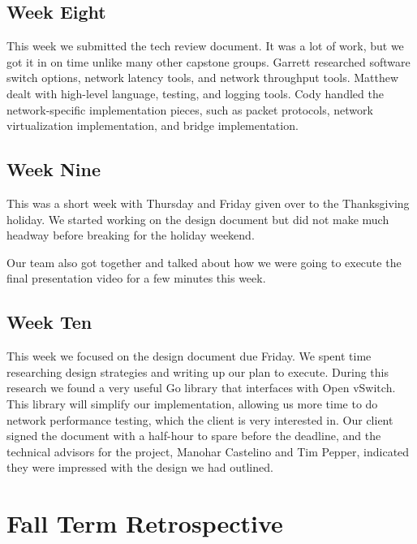 \documentclass[10pt,onecolumn,journal,draftclsnofoot]{IEEEtran}
\begin{document}
\subsection{Week Eight}

This week we submitted the tech review document. It was a lot of work, but we
got it in on time unlike many other capstone groups. Garrett researched software
switch options, network latency tools, and network throughput tools. Matthew
dealt with high-level language, testing, and logging tools. Cody handled the
network-specific implementation pieces, such as packet protocols, network
virtualization implementation, and bridge implementation.

\subsection{Week Nine}

This was a short week with Thursday and Friday given over to the Thanksgiving
holiday. We started working on the design document but did not make much headway
before breaking for the holiday weekend.

Our team also got together and talked about how we were going to execute the
final presentation video for a few minutes this week.

\subsection{Week Ten}

This week we focused on the design document due Friday. We spent time
researching design strategies and writing up our plan to execute. During this
research we found a very useful Go library that interfaces with Open vSwitch.
This library will simplify our implementation, allowing us more time to do
network performance testing, which the client is very interested in. Our client
signed the document with a half-hour to spare before the deadline, and the
technical advisors for the project, Manohar Castelino and Tim Pepper, indicated
they were impressed with the design we had outlined.

\section{Fall Term Retrospective}
\end{document}
